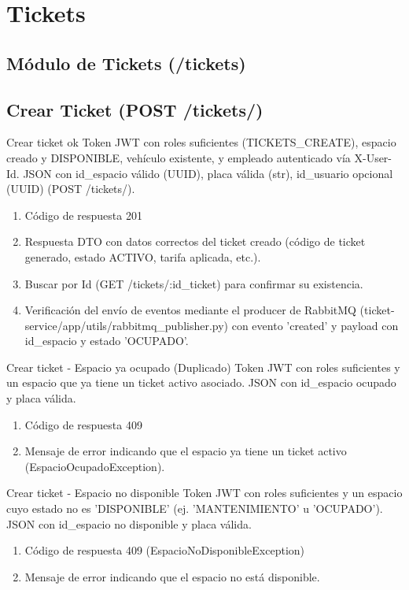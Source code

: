 \section{Tickets}
\subsection{Módulo de Tickets (/tickets)}

\subsection{Crear Ticket (POST /tickets/)}

{Crear ticket ok}
{Token JWT con roles suficientes (TICKETS\_CREATE), espacio creado y DISPONIBLE, vehículo existente, y empleado autenticado vía X-User-Id.}
{JSON con id\_espacio válido (UUID), placa válida (str), id\_usuario opcional (UUID) (POST /tickets/).}
{\begin{enumerate} [leftmargin=*, nosep]
    \item Código de respuesta 201
    \item Respuesta DTO con datos correctos del ticket creado (código de ticket generado, estado ACTIVO, tarifa aplicada, etc.).
    \item Buscar por Id (GET /tickets/:id\_ticket) para confirmar su existencia.
    \item Verificación del envío de eventos mediante el producer de RabbitMQ (ticket-service/app/utils/rabbitmq\_publisher.py) con evento 'created' y payload con id\_espacio y estado 'OCUPADO'.
\end{enumerate}}

{Crear ticket - Espacio ya ocupado (Duplicado)}
{Token JWT con roles suficientes y un espacio que ya tiene un ticket activo asociado.}
{JSON con id\_espacio ocupado y placa válida.}
{\begin{enumerate} [leftmargin=*, nosep]
    \item Código de respuesta 409
    \item Mensaje de error indicando que el espacio ya tiene un ticket activo (EspacioOcupadoException).
\end{enumerate}}

{Crear ticket - Espacio no disponible}
{Token JWT con roles suficientes y un espacio cuyo estado no es 'DISPONIBLE' (ej. 'MANTENIMIENTO' u 'OCUPADO').}
{JSON con id\_espacio no disponible y placa válida.}
{\begin{enumerate} [leftmargin=*, nosep]
    \item Código de respuesta 409 (EspacioNoDisponibleException)
    \item Mensaje de error indicando que el espacio no está disponible.
\end{enumerate}}

